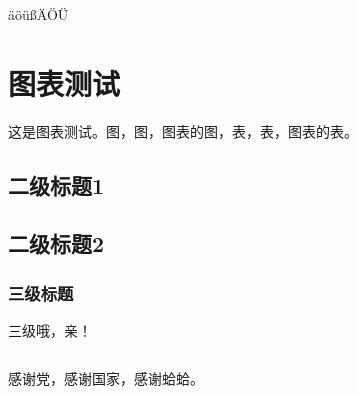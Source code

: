 \documentclass[truetimes,
               print, 
               timesmath
              ]{xjtubsc}
\begin{document}
äöüßÄÖÜ

\section{图表测试}
这是图表测试。图，图，图表的图，表，表，图表的表。
\subsection{二级标题1}
\subsection{二级标题2}
\subsubsection{三级标题}
三级哦，亲！



\backmatter




\begin{lstlisting}
\end{lstlisting}

\blindmathpaper
\blindmathpaper
{}






\begin{acknowledgment}
感谢党，感谢国家，感谢蛤蛤。
\end{acknowledgment}
\end{document}
